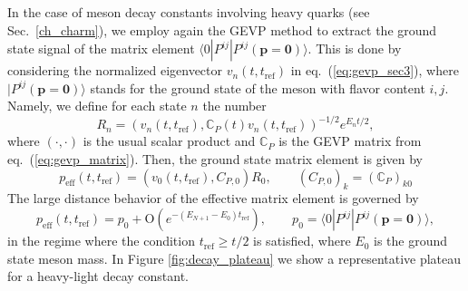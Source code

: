 In the case of meson decay constants involving heavy quarks (see Sec.~\ref{ch_charm}), we employ again the GEVP method to extract the ground state signal of the matrix element $ \langle 0 | P^{ij} | P^{ij}(\mathbf{p=0})\rangle $. This is done by considering the normalized eigenvector $v_n(t,t_{\mathrm{ref}})$ in eq.~(\ref{eq:gevp_sec3}),
where $| P^{ij}(\mathbf{p=0})\rangle$ stands for the ground state of the meson with flavor content $i,j$.  Namely, we define for each state $n$ the number \cite{Blossier:2009kd}
\begin{equation}
	R_n = \left(v_n(t,t_{\mathrm{ref}}),\mathit{\mathbb{C}}_{P}(t)v_n(t,t_{\mathrm{ref}})\right)^{-1/2} e^{E_nt/2},
	\label{eq:gevp_effective_operator}
\end{equation}
where $(\cdot, \cdot)$ is the usual scalar product and $\mathit{\mathbb{C}}_{P}$ is the GEVP matrix from eq.~(\ref{eq:gevp_matrix}).  Then, the ground state matrix element is given by
\begin{equation}
	p_{\mathrm{eff}}(t,t_{\mathrm{ref}}) = (v_0(t,t_{\mathrm{ref}}), C_{P,0}) R_0, \qquad (C_{P,0})_k = (\mathit{\mathbb{C}}_{P})_{k0} 
	\label{eq:effective_matrix_element}
\end{equation}
The large distance behavior of the effective matrix element is governed by 
\begin{equation}
	p_{\mathrm{eff}}(t,t_{\mathrm{ref}}) = p_0 + \mbox{O}(e^{-(E_{N+1}-E_0) t_{\mathrm{ref}}}), \qquad p_0 =  \langle 0 | P^{ij} | P^{ij}(\mathbf{p=0})\rangle,
\end{equation}
in the regime where the condition $t_{\mathrm{ref}}\geq t/2$ is satisfied, where $E_0$ is the ground state meson mass. In Figure \ref{fig:decay_plateau} we show a representative plateau for a heavy-light decay constant.

